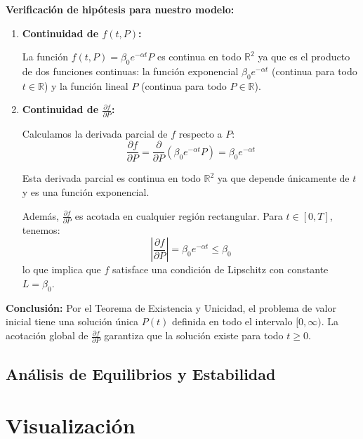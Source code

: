 \documentclass[a4paper,10pt,twocolumn]{article}
\begin{document}
\textbf{Verificación de hipótesis para nuestro modelo:}

\begin{enumerate}
    \item \textbf{Continuidad de $f(t,P)$:}

    La función $f(t,P) = \beta_0 e^{-\alpha t} P$ es continua en todo $\mathbb{R}^2$ ya que es el producto de dos funciones continuas: la función exponencial $\beta_0 e^{-\alpha t}$ (continua para todo $t \in \mathbb{R}$) y la función lineal $P$ (continua para todo $P \in \mathbb{R}$).

    \item \textbf{Continuidad de $\frac{\partial f}{\partial P}$:}

    Calculamos la derivada parcial de $f$ respecto a $P$:
    \[\frac{\partial f}{\partial P} = \frac{\partial}{\partial P}\left(\beta_0 e^{-\alpha t} P\right) = \beta_0 e^{-\alpha t}\]

    Esta derivada parcial es continua en todo $\mathbb{R}^2$ ya que depende únicamente de $t$ y es una función exponencial.

    Además, $\frac{\partial f}{\partial P}$ es acotada en cualquier región rectangular. Para $t \in [0, T]$, tenemos:
    \[\left|\frac{\partial f}{\partial P}\right| = \beta_0 e^{-\alpha t} \leq \beta_0\]
    lo que implica que $f$ satisface una condición de Lipschitz con constante $L = \beta_0$.
\end{enumerate}

\textbf{Conclusión:} Por el Teorema de Existencia y Unicidad, el problema de valor inicial tiene una solución única $P(t)$ definida en todo el intervalo $[0, \infty)$. La acotación global de $\frac{\partial f}{\partial P}$ garantiza que la solución existe para todo $t \geq 0$.


\subsection{Análisis de Equilibrios y Estabilidad}\label{subsec:equilibrios}



\section{Visualización}\label{sec:visualizacion}
\end{document}
